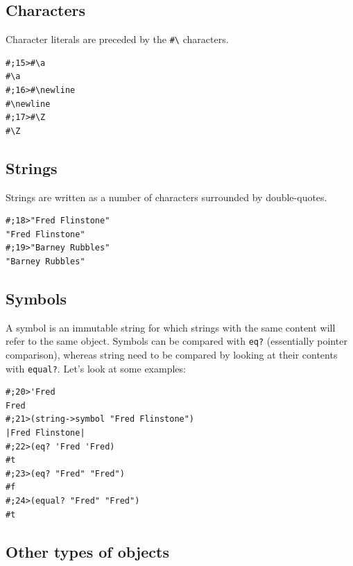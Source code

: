 \documentclass[12pt,a4paper,english,twoside]{article}
\begin{document}
\subsection{Characters}
Character literals are preceded by the 
\texttt{\#\textbackslash} characters.
\begin{lstlisting}
#;15>#\a
#\a
#;16>#\newline
#\newline
#;17>#\Z
#\Z
\end{lstlisting}
\subsection{Strings}
Strings are written as a number of characters surrounded by double-quotes.
\begin{lstlisting}
#;18>"Fred Flinstone"
"Fred Flinstone"    
#;19>"Barney Rubbles"
"Barney Rubbles"
\end{lstlisting}
\subsection{Symbols}
A symbol is an immutable string for which strings with the same content 
will refer to the same object. Symbols can be compared with 
\texttt{eq?} (essentially pointer comparison), whereas string need to be 
compared by looking at their contents with \texttt{equal?}. Let's look at some 
examples:
\begin{lstlisting}
#;20>'Fred
Fred
#;21>(string->symbol "Fred Flinstone")
|Fred Flinstone|
#;22>(eq? 'Fred 'Fred)
#t
#;23>(eq? "Fred" "Fred")
#f
#;24>(equal? "Fred" "Fred")
#t
\end{lstlisting}
\subsection{Other types of objects}
\end{document}
